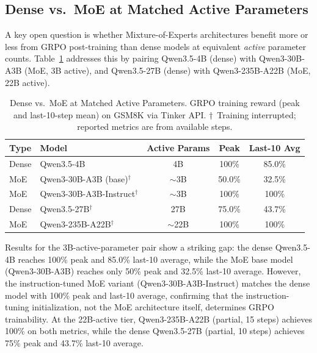 \documentclass{article}
\begin{document}
\subsection{Dense vs.~MoE at Matched Active Parameters}
\label{sec:dense_moe}

A key open question is whether Mixture-of-Experts architectures benefit
more or less from GRPO post-training than dense models at equivalent
\emph{active} parameter counts. Table~\ref{tab:dense_moe} addresses this
by pairing Qwen3.5-4B (dense) with Qwen3-30B-A3B (MoE, 3B active),
and Qwen3.5-27B (dense) with Qwen3-235B-A22B (MoE, 22B active).

\begin{table}[htbp]
\centering
\caption{Dense vs.~MoE at Matched Active Parameters. GRPO training reward (peak and
last-10-step mean) on GSM8K via Tinker API.
$\dagger$~Training interrupted; reported metrics are from available steps.}
\label{tab:dense_moe}
\begin{tabular}{llccc}
\toprule
\textbf{Type} & \textbf{Model} & \textbf{Active Params} & \textbf{Peak} & \textbf{Last-10 Avg} \\
\midrule
Dense & Qwen3.5-4B & 4B & 100\% & 85.0\% \\
MoE & Qwen3-30B-A3B (base)$^\dagger$ & $\sim$3B & 50.0\% & 32.5\% \\
MoE & Qwen3-30B-A3B-Instruct$^\dagger$ & $\sim$3B & 100\% & 100\% \\
\midrule
Dense & Qwen3.5-27B$^\dagger$ & 27B & 75.0\% & 43.7\% \\
MoE & Qwen3-235B-A22B$^\dagger$ & $\sim$22B & 100\% & 100\% \\
\bottomrule
\end{tabular}
\end{table}

Results for the 3B-active-parameter pair show a striking gap: the dense
Qwen3.5-4B reaches 100\% peak and 85.0\% last-10 average, while the
MoE base model (Qwen3-30B-A3B) reaches only 50\% peak and 32.5\% last-10
average. However, the instruction-tuned MoE variant (Qwen3-30B-A3B-Instruct)
matches the dense model with 100\% peak and last-10 average, confirming that
the instruction-tuning initialization, not the MoE architecture itself,
determines GRPO trainability. At the 22B-active tier, Qwen3-235B-A22B
(partial, 15 steps) achieves 100\% on both metrics, while the dense
Qwen3.5-27B (partial, 10 steps) achieves 75\% peak and 43.7\% last-10 average.
\end{document}
